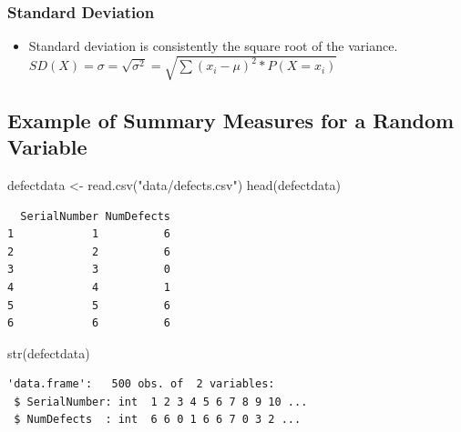 \documentclass[
  letterpaper,
  DIV=11,
  numbers=noendperiod]{scrreprt}
\newenvironment{Shaded}{\begin{snugshade}}{\end{snugshade}}
\newcommand{\CommentTok}[1]{\textcolor[rgb]{0.37,0.37,0.37}{#1}}
\newcommand{\DecValTok}[1]{\textcolor[rgb]{0.68,0.00,0.00}{#1}}
\newcommand{\FunctionTok}[1]{\textcolor[rgb]{0.28,0.35,0.67}{#1}}
\newcommand{\NormalTok}[1]{\textcolor[rgb]{0.00,0.23,0.31}{#1}}
\newcommand{\OtherTok}[1]{\textcolor[rgb]{0.00,0.23,0.31}{#1}}
\newcommand{\SpecialCharTok}[1]{\textcolor[rgb]{0.37,0.37,0.37}{#1}}
\newcommand{\StringTok}[1]{\textcolor[rgb]{0.13,0.47,0.30}{#1}}
\providecommand{\tightlist}{%
  \setlength{\itemsep}{0pt}\setlength{\parskip}{0pt}}\usepackage{longtable,booktabs,array}
\begin{document}
\subsubsection{Standard Deviation}\label{standard-deviation}

\begin{itemize}
\tightlist
\item
  Standard deviation is consistently the square root of the variance.
  \(SD(X) = \sigma = \sqrt{\sigma^2} = \sqrt{\sum{(x_i-\mu)^2*P(X=x_i)}}\)
\end{itemize}

\subsection{Example of Summary Measures for a Random
Variable}\label{example-of-summary-measures-for-a-random-variable}

\begin{Shaded}
\begin{Highlighting}[]
\NormalTok{defectdata }\OtherTok{\textless{}{-}} \FunctionTok{read.csv}\NormalTok{(}\StringTok{"data/defects.csv"}\NormalTok{)}
\FunctionTok{head}\NormalTok{(defectdata)}
\end{Highlighting}
\end{Shaded}

\begin{verbatim}
  SerialNumber NumDefects
1            1          6
2            2          6
3            3          0
4            4          1
5            5          6
6            6          6
\end{verbatim}

\begin{Shaded}
\begin{Highlighting}[]
\FunctionTok{str}\NormalTok{(defectdata)}
\end{Highlighting}
\end{Shaded}

\begin{verbatim}
'data.frame':   500 obs. of  2 variables:
 $ SerialNumber: int  1 2 3 4 5 6 7 8 9 10 ...
 $ NumDefects  : int  6 6 0 1 6 6 7 0 3 2 ...
\end{verbatim}

\begin{Shaded}
\end{Shaded}
\end{document}
